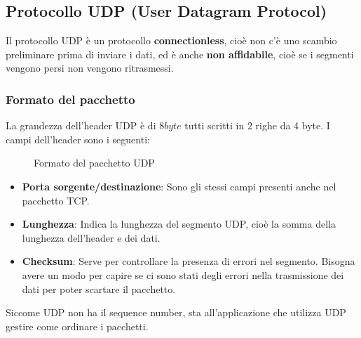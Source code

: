 \documentclass[a4paper]{article}
\begin{document}
\subsection{Protocollo UDP (User Datagram Protocol)}
Il protocollo UDP è un protocollo \textbf{connectionless}, cioè non c'è uno scambio
preliminare prima di inviare i dati, ed è anche \textbf{non affidabile}, cioè
se i segmenti vengono persi non vengono ritrasmessi.

\subsubsection{Formato del pacchetto}
La grandezza dell'header UDP è di \( 8 byte \) tutti scritti in 2 righe da 4 byte. I
campi dell'header sono i seguenti:
\begin{figure}[H]
  \centering
  \caption{Formato del pacchetto UDP}
\end{figure}

\begin{itemize}
  \item \textbf{Porta sorgente/destinazione}: Sono gli stessi campi presenti anche nel
    pacchetto TCP.

  \item \textbf{Lunghezza}: Indica la lunghezza del segmento UDP, cioè la somma della
    lunghezza dell'header e dei dati.

  \item \textbf{Checksum}: Serve per controllare la presenza di errori nel segmento.
    Bisogna avere un modo per capire se ci sono stati degli errori nella trasmissione dei
    dati per poter scartare il pacchetto.
\end{itemize}
Siccome UDP non ha il sequence number, sta all'applicazione che utilizza UDP gestire
come ordinare i pacchetti.
\end{document}
